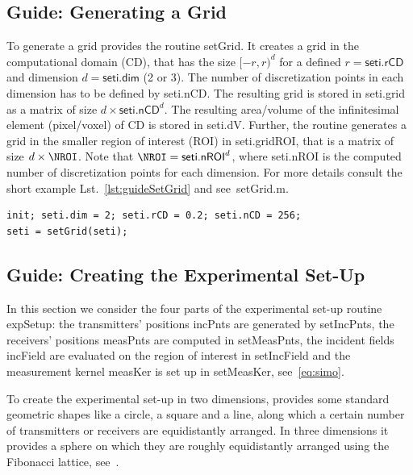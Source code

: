 \documentclass[a4paper]{article}
\begin{document}

\subsection{Guide: Generating a Grid}\label{sec:guide:setGrid}

To generate a grid \IPscatt provides the routine \textsf{setGrid}. It creates a grid in the computational domain (CD), that has the size $[-r,r)^d$ for a defined $r = \textsf{seti.rCD}$ and dimension $d = \textsf{seti.dim}$ (2 or 3). The number of discretization points in each dimension has to be defined by \textsf{seti.nCD}. The resulting grid is stored in \textsf{seti.grid} as a matrix of size $ d \times \textsf{seti.nCD}^d$. The resulting area/volume of the infinitesimal element (pixel/voxel) of CD is stored in \textsf{seti.dV}. Further, the routine generates a grid in the smaller region of interest (ROI) in \textsf{seti.gridROI}, that is a matrix of size $d \times \NROI$. Note that $\NROI = \textsf{seti.nROI}^d$, where \textsf{seti.nROI} is the computed number of discretization points for each dimension. 
For more details consult the short example Lst.~\ref{lst:guideSetGrid} and see~\textsf{setGrid.m}.
\begin{lstlisting}[caption={Generate a grid with \textsf{setGrid} (\emph{source code}: \textsf{guides/guideSetGrid.m}).},label=lst:guideSetGrid]
init; seti.dim = 2; seti.rCD = 0.2; seti.nCD = 256;
seti = setGrid(seti);
\end{lstlisting}


\subsection{Guide: Creating the Experimental Set-Up}\label{sec:guide:expSetup}

In this section we consider the four parts of the experimental set-up routine \textsf{expSetup}: the transmitters' positions \textsf{incPnts} are generated by \textsf{setIncPnts}, the receivers' positions \textsf{measPnts} are computed in \textsf{setMeasPnts}, the incident fields \textsf{incField} are evaluated on the region of interest in \textsf{setIncField} and the measurement kernel \textsf{measKer} is set up in \textsf{setMeasKer}, see~\eqref{eq:simo}.

To create the experimental set-up in two dimensions, \IPscatt provides some standard geometric shapes like a circle, a square and a line, along which a certain number of transmitters or receivers are equidistantly arranged. In three dimensions it provides a sphere on which they are roughly equidistantly arranged using the Fibonacci lattice, see~\cite[Sec.~3.1]{Gonzalez2010}.
\end{document}

